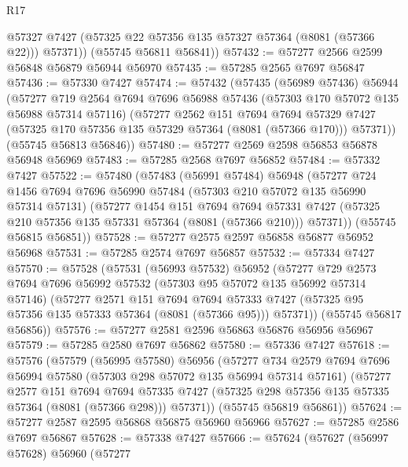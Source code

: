 \begin{lexlean}{R17}
\begin{coremodule}
          @57327
          @7427
          (@57325 @22 @57356 @135 @57327 @57364 (@8081 (@57366 @22)))
          @57371))
      (@55745 @56811 @56841))
@57432 := @57277 @2566 @2599 @56848 @56879 @56944 @56970
@57435 := @57285 @2565 @7697 @56847
@57436 := @57330 @7427
@57474 := @57432
    (@57435
      (@56989 @57436)
      @56944
      (@57277
        @719
        @2564
        @7694
        @7696
        @56988
        @57436
        (@57303 @170 @57072 @135 @56988 @57314 @57116)
        (@57277
          @2562
          @151
          @7694
          @7694
          @57329
          @7427
          (@57325 @170 @57356 @135 @57329 @57364 (@8081 (@57366 @170)))
          @57371))
      (@55745 @56813 @56846))
@57480 := @57277 @2569 @2598 @56853 @56878 @56948 @56969
@57483 := @57285 @2568 @7697 @56852
@57484 := @57332 @7427
@57522 := @57480
    (@57483
      (@56991 @57484)
      @56948
      (@57277
        @724
        @1456
        @7694
        @7696
        @56990
        @57484
        (@57303 @210 @57072 @135 @56990 @57314 @57131)
        (@57277
          @1454
          @151
          @7694
          @7694
          @57331
          @7427
          (@57325 @210 @57356 @135 @57331 @57364 (@8081 (@57366 @210)))
          @57371))
      (@55745 @56815 @56851))
@57528 := @57277 @2575 @2597 @56858 @56877 @56952 @56968
@57531 := @57285 @2574 @7697 @56857
@57532 := @57334 @7427
@57570 := @57528
    (@57531
      (@56993 @57532)
      @56952
      (@57277
        @729
        @2573
        @7694
        @7696
        @56992
        @57532
        (@57303 @95 @57072 @135 @56992 @57314 @57146)
        (@57277
          @2571
          @151
          @7694
          @7694
          @57333
          @7427
          (@57325 @95 @57356 @135 @57333 @57364 (@8081 (@57366 @95)))
          @57371))
      (@55745 @56817 @56856))
@57576 := @57277 @2581 @2596 @56863 @56876 @56956 @56967
@57579 := @57285 @2580 @7697 @56862
@57580 := @57336 @7427
@57618 := @57576
    (@57579
      (@56995 @57580)
      @56956
      (@57277
        @734
        @2579
        @7694
        @7696
        @56994
        @57580
        (@57303 @298 @57072 @135 @56994 @57314 @57161)
        (@57277
          @2577
          @151
          @7694
          @7694
          @57335
          @7427
          (@57325 @298 @57356 @135 @57335 @57364 (@8081 (@57366 @298)))
          @57371))
      (@55745 @56819 @56861))
@57624 := @57277 @2587 @2595 @56868 @56875 @56960 @56966
@57627 := @57285 @2586 @7697 @56867
@57628 := @57338 @7427
@57666 := @57624
    (@57627
      (@56997 @57628)
      @56960
      (@57277

\end{coremodule}
\end{lexlean}
